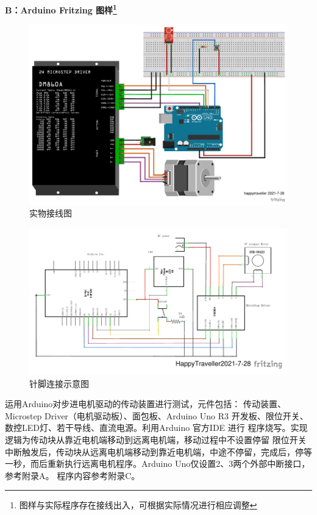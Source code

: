 \documentclass[UTF8,14pt]{article}
\newcommand\sectiontwo[1]{\centerline{\large{\bfseries{#1}}}}
\begin{document}
\clearpage
\sectiontwo{B：Arduino Fritzing 图样\footnote[1]{图样与实际程序存在接线出入，可根据实际情况进行相应调整}}
\begin{figure}[!h]
	\centering
	\includegraphics[width=14cm]{figures/直观图.pdf}
	\vspace{-10pt}
	\caption{实物接线图}
\end{figure}

\begin{figure}[!h]
	\centering
	\includegraphics[width=14cm]{figures/Arduino 布线.pdf}
	\vspace{-10pt}
	\caption{针脚连接示意图}
\end{figure}

运用Arduino对步进电机驱动的传动装置进行测试，元件包括：
传动装置、Microstep Driver（电机驱动板）、面包板、Arduino Uno R3
开发板、限位开关、数控LED灯、若干导线、直流电源。利用Arduino 官方IDE 进行
程序烧写。实现逻辑为传动块从靠近电机端移动到远离电机端，移动过程中不设置停留
限位开关中断触发后，传动块从远离电机端移动到靠近电机端，中途不停留，完成后，停等
一秒，而后重新执行远离电机程序。Arduino Uno仅设置2、3两个外部中断接口，参考附录A。
程序内容参考附录C。
\end{document}
